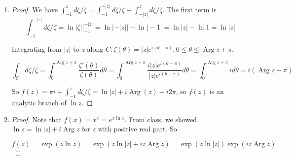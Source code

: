\documentclass[11pt, letterpaper]{article}
\begin{document}
\begin{enumerate}
\begin{proof}
    If the line segments travel in the same direction, then $x = c$ and $y = d$, so we can decompose $\gamma$ as $\gamma_1 \cup \gamma_2$, where $\gamma_1 = \gamma(t), t \in [x, y] \cup [d, c]$ and $\gamma_2 = \gamma(t), t \in [a, x] \cup [c, y] \cup [d, b]$. Note that $\gamma_1$ is a line segment traversed twice in opposite directions, and $\gamma_2$ is a closed polygonal path.
    
    If the line segments travel in opposite directions, then $x = d$ and $y = c$. Decompose $\gamma = \gamma_1 \cup \gamma_2 \cup \gamma_3$ where $\gamma_1 = \gamma(t), t \in [a, d] \cup [d, b]$, $\gamma_2 = \gamma(t), t \in [y, c]$ and $\gamma_3 = \gamma(t), t \in [x, y] \cup [c, d]$. Note that $\gamma_1$ and $\gamma_2$ are closed polygonal paths, and $\gamma_3$ is a line segment traversed in two directions.
  \end{proof}

  \item \begin{proof}
    We have $\int_{-1}^z d\zeta/\zeta = \int_{-1}^{-\vert z \vert} d\zeta/\zeta + \int_{-\vert z \vert}^z d\zeta/\zeta$. The first term is 
    $$
    \int_{-1}^{-\vert z \vert} d\zeta/\zeta = \ln \vert \zeta \vert \vert_{-1}^{-\vert z \vert} = \ln \vert -\vert z \vert \vert - \ln \vert -1 \vert = \ln \vert z \vert - \ln 1 = \ln \vert z \vert
    $$
    
    Integrating from $\vert z \vert$ to $z$ along $C: \zeta(\theta) = \vert z \vert e^{i(\theta - \pi)}, 0 \leq \theta \leq \operatorname{Arg} z + \pi$,
    
    $$
    \int_C d\zeta/\zeta = \int_0^{\operatorname{Arg} z + \pi} \frac{\zeta'(\theta)}{\zeta(\theta)} d\theta = \int_0^{\operatorname{Arg} z + \pi} \frac{i\vert z \vert e^{i(\theta - \pi)}}{\vert z \vert e^{i(\theta - \pi)}} d\theta = \int_0^{\operatorname{Arg} z + \pi} i d\theta = i(\operatorname{Arg} z + \pi)
    $$
    
    So $f(z) = \pi i + \int_{-1}^z d\zeta / \zeta = \ln \vert z \vert + i\operatorname{Arg}(z) + i2\pi$, so $f(z)$ is an analytic branch of $\ln z$.
  \end{proof}

  \item \begin{proof}
    Note that $f(x) = x^x = e^{x \ln x}$. From class, we showed $\ln z = \ln \vert z \vert + i\operatorname{Arg} z$ for $z$ with positive real part. So
    
    $$
    f(z) = \exp({z \ln z}) = \exp(z \ln \vert z \vert + iz \operatorname{Arg} z) = \exp(z \ln \vert z \vert) \exp(iz \operatorname{Arg} z)
    $$


\end{proof}
\end{enumerate}
\end{document}

